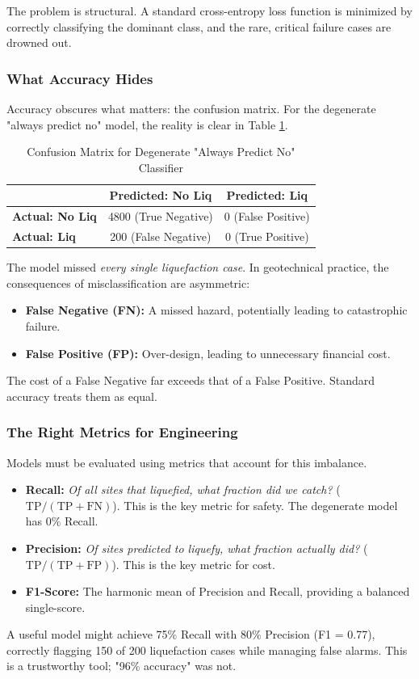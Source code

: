 \documentclass[12pt]{article}
\begin{document}
The problem is structural. A standard cross-entropy loss function is minimized by correctly classifying the dominant class, and the rare, critical failure cases are drowned out.

\subsubsection{What Accuracy Hides}
Accuracy obscures what matters: the confusion matrix. For the degenerate "always predict no" model, the reality is clear in Table \ref{tab:confusion_degenerate}.

\begin{table}[h]
	\centering
	\caption{Confusion Matrix for Degenerate "Always Predict No" Classifier}
	\label{tab:confusion_degenerate}
	\begin{tabular}{@{}lcc@{}}
		\toprule
		& \textbf{Predicted: No Liq} & \textbf{Predicted: Liq} \\ \midrule
		\textbf{Actual: No Liq} & 4800 (True Negative) & 0 (False Positive) \\
		\textbf{Actual: Liq} & 200 (False Negative) & 0 (True Positive) \\ \bottomrule
	\end{tabular}
\end{table}

The model missed \textit{every single liquefaction case}. In geotechnical practice, the consequences of misclassification are asymmetric:
\begin{itemize}
	\item \textbf{False Negative (FN):} A missed hazard, potentially leading to catastrophic failure.
	\item \textbf{False Positive (FP):} Over-design, leading to unnecessary financial cost.
\end{itemize}
The cost of a False Negative far exceeds that of a False Positive. Standard accuracy treats them as equal.

\subsubsection{The Right Metrics for Engineering}
Models must be evaluated using metrics that account for this imbalance.
\begin{itemize}
	\item \textbf{Recall:} \textit{Of all sites that liquefied, what fraction did we catch?} ($\text{TP} / (\text{TP} + \text{FN})$). This is the key metric for safety. The degenerate model has 0\% Recall.
	\item \textbf{Precision:} \textit{Of sites predicted to liquefy, what fraction actually did?} ($\text{TP} / (\text{TP} + \text{FP})$). This is the key metric for cost.
	\item \textbf{F1-Score:} The harmonic mean of Precision and Recall, providing a balanced single-score.
\end{itemize}
A useful model might achieve 75\% Recall with 80\% Precision (F1 = 0.77), correctly flagging 150 of 200 liquefaction cases while managing false alarms. This is a trustworthy tool; "96\% accuracy" was not.
\end{document}
